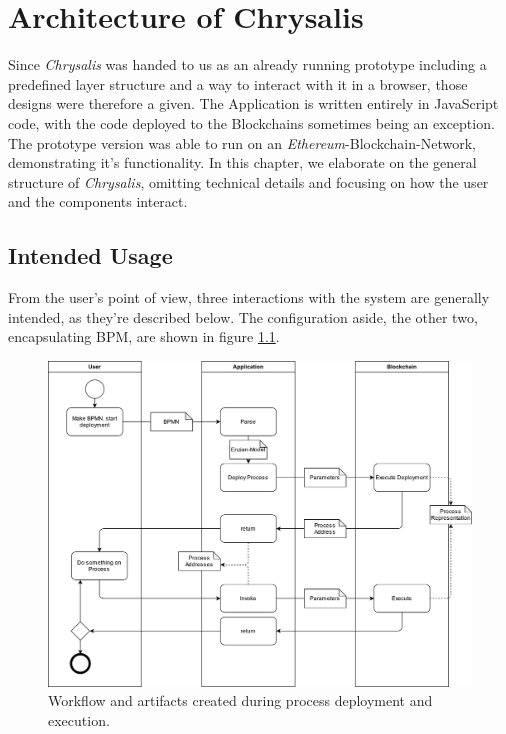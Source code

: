 %
\chapter{Architecture of Chrysalis}
\label{sec:init}

Since \emph{Chrysalis} was handed to us as an already running prototype including a predefined layer structure and a way to interact with it in a browser, those designs were therefore a given. The Application is written entirely in JavaScript code, with the code deployed to the Blockchains sometimes being an exception.
The prototype version was able to run on an \emph{Ethereum}-Blockchain-Network, demonstrating it's functionality.
In this chapter, we elaborate on the general structure of \emph{Chrysalis}, omitting technical details and focusing on how the user and the components interact.

\section{Intended Usage}
\label{sec:init:usage}

From the user's point of view, three interactions with the system are generally intended, as they're described below. The configuration aside, the other two, encapsulating BPM, are shown in figure \ref{fig:init:usage:bpm}.

\begin{figure}[h]
	\centering
	\captionsetup{justification=centering,margin=2cm}
	\includegraphics[height=0.7\textwidth]{gfx/bpmn2bc}
	\caption{Workflow and artifacts created during process deployment and execution.}
	\label{fig:init:usage:bpm}
\end{figure}


